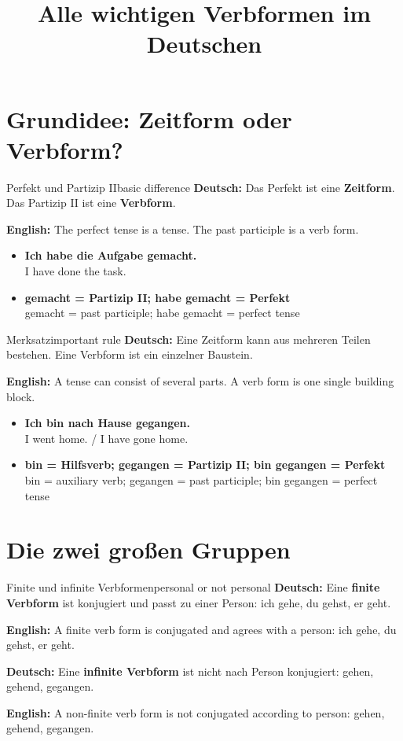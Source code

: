 \documentclass[a4paper,11pt]{article}
\title{Alle wichtigen Verbformen im Deutschen}
\author{}
\date{}
\newcommand{\GermanText}[1]{\textbf{Deutsch: }#1\par}
\newcommand{\EnglishText}[1]{{\small\color{SoftGray}\textbf{English: }#1\par}}
\newcommand{\ExampleItem}[2]{\item \textbf{#1}\\{\small\color{SoftGray}#2}}
\begin{document}
    \maketitle
    \tableofcontents
    \newpage

\section{Grundidee: Zeitform oder Verbform?}

\begin{grammarentry}{Perfekt und Partizip II}{basic difference}
\GermanText{Das Perfekt ist eine \textbf{Zeitform}. Das Partizip II ist eine \textbf{Verbform}.}
\EnglishText{The perfect tense is a tense. The past participle is a verb form.}

\begin{exbox}
\begin{itemize}
    \ExampleItem{Ich habe die Aufgabe gemacht.}{I have done the task.}
    \ExampleItem{gemacht = Partizip II; habe gemacht = Perfekt}{gemacht = past participle; habe gemacht = perfect tense}
\end{itemize}
\end{exbox}
\end{grammarentry}

\begin{grammarentry}{Merksatz}{important rule}
\GermanText{Eine Zeitform kann aus mehreren Teilen bestehen. Eine Verbform ist ein einzelner Baustein.}
\EnglishText{A tense can consist of several parts. A verb form is one single building block.}

\begin{exbox}
\begin{itemize}
    \ExampleItem{Ich bin nach Hause gegangen.}{I went home. / I have gone home.}
    \ExampleItem{bin = Hilfsverb; gegangen = Partizip II; bin gegangen = Perfekt}{bin = auxiliary verb; gegangen = past participle; bin gegangen = perfect tense}
\end{itemize}
\end{exbox}
\end{grammarentry}

\section{Die zwei großen Gruppen}

\begin{grammarentry}{Finite und infinite Verbformen}{personal or not personal}
\GermanText{Eine \textbf{finite Verbform} ist konjugiert und passt zu einer Person: ich gehe, du gehst, er geht.}
\EnglishText{A finite verb form is conjugated and agrees with a person: ich gehe, du gehst, er geht.}
\GermanText{Eine \textbf{infinite Verbform} ist nicht nach Person konjugiert: gehen, gehend, gegangen.}
\EnglishText{A non-finite verb form is not conjugated according to person: gehen, gehend, gegangen.}
\end{grammarentry}
\end{document}
